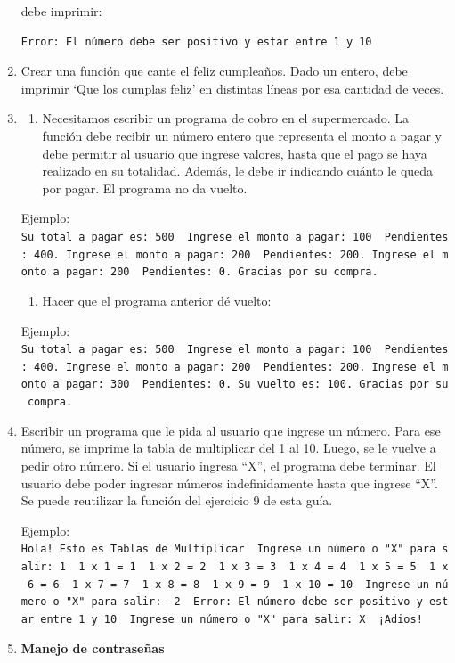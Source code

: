 \documentclass[
  letterpaper,
  DIV=11,
  numbers=noendperiod]{scrreprt}
\providecommand{\tightlist}{%
  \setlength{\itemsep}{0pt}\setlength{\parskip}{0pt}}\usepackage{longtable,booktabs,array}
\begin{document}
\begin{enumerate}
  debe imprimir:

\begin{verbatim}
Error: El número debe ser positivo y estar entre 1 y 10
\end{verbatim}
\item
  Crear una función que cante el feliz cumpleaños. Dado un entero, debe
  imprimir `Que los cumplas feliz' en distintas líneas por esa cantidad
  de veces.
\item
  \begin{enumerate}
  \def\labelenumii{\alph{enumii}.}
  \tightlist
  \item
    Necesitamos escribir un programa de cobro en el supermercado. La
    función debe recibir un número entero que representa el monto a
    pagar y debe permitir al usuario que ingrese valores, hasta que el
    pago se haya realizado en su totalidad. Además, le debe ir indicando
    cuánto le queda por pagar. El programa no da vuelto.
  \end{enumerate}

  Ejemplo:
  \texttt{Su\ total\ a\ pagar\ es:\ 500\ \ Ingrese\ el\ monto\ a\ pagar:\ 100\ \ Pendientes:\ 400.\ Ingrese\ el\ monto\ a\ pagar:\ 200\ \ Pendientes:\ 200.\ Ingrese\ el\ monto\ a\ pagar:\ 200\ \ Pendientes:\ 0.\ Gracias\ por\ su\ compra.}

  \begin{enumerate}
  \def\labelenumii{\alph{enumii}.}
  \setcounter{enumii}{1}
  \tightlist
  \item
    Hacer que el programa anterior dé vuelto:
  \end{enumerate}

  Ejemplo:
  \texttt{Su\ total\ a\ pagar\ es:\ 500\ \ Ingrese\ el\ monto\ a\ pagar:\ 100\ \ Pendientes:\ 400.\ Ingrese\ el\ monto\ a\ pagar:\ 200\ \ Pendientes:\ 200.\ Ingrese\ el\ monto\ a\ pagar:\ 300\ \ Pendientes:\ 0.\ Su\ vuelto\ es:\ 100.\ Gracias\ por\ su\ compra.}
\item
  Escribir un programa que le pida al usuario que ingrese un número.
  Para ese número, se imprime la tabla de multiplicar del 1 al 10.
  Luego, se le vuelve a pedir otro número. Si el usuario ingresa ``X'',
  el programa debe terminar. El usuario debe poder ingresar números
  indefinidamente hasta que ingrese ``X''. Se puede reutilizar la
  función del ejercicio 9 de esta guía.

  Ejemplo:
  \texttt{Hola!\ Esto\ es\ Tablas\ de\ Multiplicar\ \ Ingrese\ un\ número\ o\ "X"\ para\ salir:\ 1\ \ 1\ x\ 1\ =\ 1\ \ 1\ x\ 2\ =\ 2\ \ 1\ x\ 3\ =\ 3\ \ 1\ x\ 4\ =\ 4\ \ 1\ x\ 5\ =\ 5\ \ 1\ x\ 6\ =\ 6\ \ 1\ x\ 7\ =\ 7\ \ 1\ x\ 8\ =\ 8\ \ 1\ x\ 9\ =\ 9\ \ 1\ x\ 10\ =\ 10\ \ Ingrese\ un\ número\ o\ "X"\ para\ salir:\ -2\ \ Error:\ El\ número\ debe\ ser\ positivo\ y\ estar\ entre\ 1\ y\ 10\ \ Ingrese\ un\ número\ o\ "X"\ para\ salir:\ X\ \ ¡Adios!}
\item
  \textbf{Manejo de contraseñas}


\end{enumerate}
\end{document}
